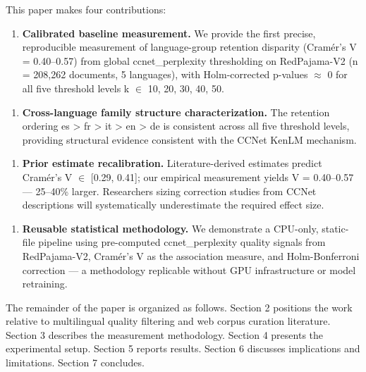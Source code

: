 This paper makes four contributions:

\begin{enumerate}
\item \textbf{Calibrated baseline measurement.} We provide the first precise, reproducible measurement of language-group retention disparity (Cramér's V = 0.40--0.57) from global ccnet\_perplexity thresholding on RedPajama-V2 (n = 208,262 documents, 5 languages), with Holm-corrected p-values $\approx$ 0 for all five threshold levels k $\in$ {10, 20, 30, 40, 50}.
\end{enumerate}

\begin{enumerate}
\item \textbf{Cross-language family structure characterization.} The retention ordering es > fr > it > en > de is consistent across all five threshold levels, providing structural evidence consistent with the CCNet KenLM mechanism.
\end{enumerate}

\begin{enumerate}
\item \textbf{Prior estimate recalibration.} Literature-derived estimates predict Cramér's V $\in$ [0.29, 0.41]; our empirical measurement yields V = 0.40--0.57 --- 25--40\% larger. Researchers sizing correction studies from CCNet descriptions will systematically underestimate the required effect size.
\end{enumerate}

\begin{enumerate}
\item \textbf{Reusable statistical methodology.} We demonstrate a CPU-only, static-file pipeline using pre-computed ccnet\_perplexity quality signals from RedPajama-V2, Cramér's V as the association measure, and Holm-Bonferroni correction --- a methodology replicable without GPU infrastructure or model retraining.
\end{enumerate}

The remainder of the paper is organized as follows. Section 2 positions the work relative to multilingual quality filtering and web corpus curation literature. Section 3 describes the measurement methodology. Section 4 presents the experimental setup. Section 5 reports results. Section 6 discusses implications and limitations. Section 7 concludes.

